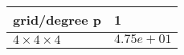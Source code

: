 \begin{tabular}{ll}
\hline
 grid/degree p         & 1          \\
\hline
 $4 \times 4 \times 4$ & $4.75e+01$ \\
\hline
\end{tabular}